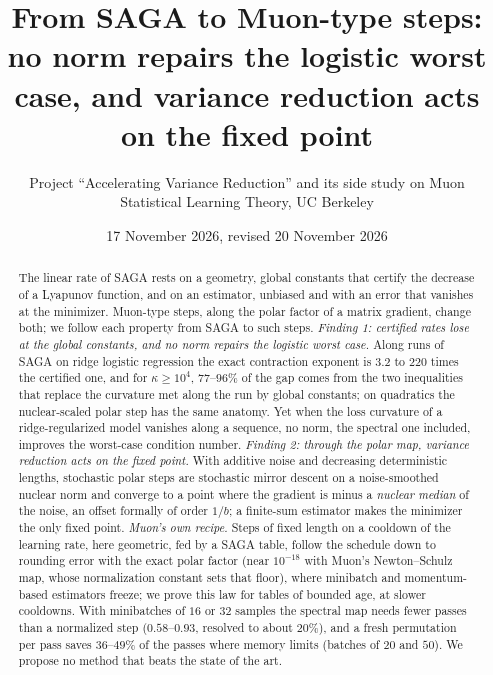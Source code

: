 \documentclass[10pt]{article}
\title{\vspace{-2.2em}From SAGA to Muon-type steps:\\ no norm repairs the logistic worst case, and variance reduction
acts on the fixed point}
\author{Project ``Accelerating Variance Reduction'' and its side study on Muon\\ Statistical Learning Theory, UC Berkeley}
\date{\vspace{-0.4em}17 November 2026, revised 20 November 2026}
\makeatletter
\renewcommand\section{\@startsection{section}{1}{\z@}{-2.4ex \@plus -0.6ex \@minus -.2ex}{1.2ex \@plus .2ex}{\normalfont\large\bfseries}}
\theoremstyle{remark}
\makeatother
\begin{document}
\maketitle

\begin{abstract}
The linear rate of SAGA rests on a geometry, global constants that certify the decrease of a Lyapunov function, and on
an estimator, unbiased and with an error that vanishes at the minimizer. Muon-type steps, along the polar factor of a
matrix gradient, change both; we follow each property from SAGA to such steps. \emph{Finding 1: certified rates lose at
the global constants, and no norm repairs the logistic worst case.} Along runs of SAGA on ridge logistic regression the
exact contraction exponent is $3.2$ to $220$ times the certified one, and for $\kappa\ge10^4$, $77$--$96\%$ of the gap
comes from the two inequalities that replace the curvature met along the run by global constants; on quadratics the nuclear-scaled
polar step has the same anatomy. Yet when the loss curvature of a ridge-regularized model vanishes along a sequence, no
norm, the spectral one included, improves the worst-case condition number. \emph{Finding 2: through the polar map,
variance reduction acts on the fixed point.} With additive noise and decreasing deterministic lengths, stochastic polar
steps are stochastic mirror descent on a noise-smoothed nuclear norm and converge to a point where the gradient is minus
a \emph{nuclear median} of the noise, an offset formally of order $1/b$; a finite-sum estimator makes the minimizer the
only fixed point. \emph{Muon's own recipe.} Steps of fixed length on a cooldown of the learning rate, here geometric, fed by a
SAGA table, follow the schedule down to rounding error with the exact polar factor (near $10^{-18}$ with Muon's
Newton--Schulz map, whose normalization constant sets that floor), where minibatch and momentum-based estimators freeze;
we prove this law for tables of bounded age, at slower cooldowns. With minibatches of $16$ or $32$ samples the spectral
map needs fewer passes than a normalized step ($0.58$--$0.93$, resolved to about $20\%$), and a fresh permutation per pass saves $36$--$49\%$ of the
passes where memory limits (batches of $20$ and $50$). We propose no method that beats the state of the art.
\end{abstract}

\section{Introduction}\label{sec:intro}
\end{document}
